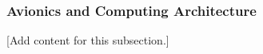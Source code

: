 
\subsubsection{Avionics and Computing Architecture}
\label{subsubsec:design_5_2_avionics_computing_architecture}

[Add content for this subsection.]
